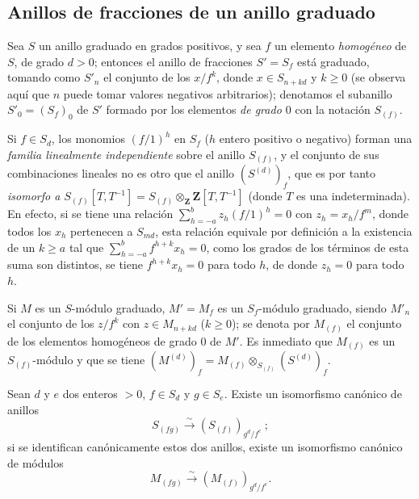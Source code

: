 \documentclass[oneside,10pt]{amsart}
\renewcommand{\geq}{\geqslant}
\newcommand{\oldpage}[2][]{\marginnote{\normalfont\footnotesize\textbf{#1}~|~#2}\ignorespaces}
\let\EGAOriginalLabel\label
\renewcommand{\label}[1]{\phantomsection\EGAOriginalLabel{#1}}
\begin{document}
\subsection{Anillos de fracciones de un anillo graduado}
\label{subsection:II.2.2-fr}

\begin{env}[2.2.1]
\label{II.2.2.1-fr}
Sea $S$ un anillo graduado en grados positivos, y sea $f$ un elemento \emph{homogéneo} de $S$, de grado $d>0$; entonces el anillo de fracciones $S'=S_f$ está graduado, tomando como $S'_n$ el conjunto de los $x/f^k$, donde $x\in S_{n+kd}$ y $k\geq 0$ (se observa aquí que $n$ puede tomar valores negativos arbitrarios); denotamos el subanillo $S'_0=(S_f)_0$ de $S'$ formado por los elementos \emph{de grado $0$} con la notación $S_{(f)}$.

Si $f\in S_d$, los monomios $(f/1)^h$ en $S_f$ ($h$ entero positivo o negativo) forman una \emph{familia linealmente independiente} sobre el anillo $S_{(f)}$, y el conjunto de sus combinaciones lineales no es otro que
\oldpage[II]{24}
el anillo $(S^{(d)})_f$, que es por tanto \emph{isomorfo a $S_{(f)}[T,T^{-1}]=S_{(f)}\otimes_{\mathbf{Z}}\mathbf{Z}[T,T^{-1}]$} (donde $T$ es una indeterminada).
En efecto, si se tiene una relación
$\sum_{h=-a}^{b}z_h(f/1)^h=0$
con $z_h=x_h/f^m$, donde todos los $x_h$ pertenecen a $S_{md}$, esta relación equivale por definición a la existencia de un $k\geq a$ tal que
$\sum_{h=-a}^{b}f^{h+k}x_h=0$,
como los grados de los términos de esta suma son distintos, se tiene $f^{h+k}x_h=0$ para todo $h$, de donde $z_h=0$ para todo $h$.

Si $M$ es un $S$-módulo graduado, $M'=M_f$ es un $S_f$-módulo graduado, siendo $M'_n$ el conjunto de los $z/f^k$ con $z\in M_{n+kd}$ ($k\geq 0$); se denota por $M_{(f)}$ el conjunto de los elementos homogéneos de grado $0$ de $M'$.
Es inmediato que $M_{(f)}$ es un $S_{(f)}$-módulo y que se tiene
$(M^{(d)})_f=M_{(f)}\otimes_{S_{(f)}}(S^{(d)})_f$.
\end{env}

\begin{lemma}[2.2.2]
\label{II.2.2.2-fr}
Sean $d$ y $e$ dos enteros $>0$, $f\in S_d$ y $g\in S_e$.
Existe un isomorfismo canónico de anillos
\[
  S_{(fg)}\xrightarrow{\sim}(S_{(f)})_{g^d/f^e}~;
\]
si se identifican canónicamente estos dos anillos, existe un isomorfismo canónico de módulos
\[
  M_{(fg)}\xrightarrow{\sim}(M_{(f)})_{g^d/f^e}.
\]
\end{lemma}
\end{document}
